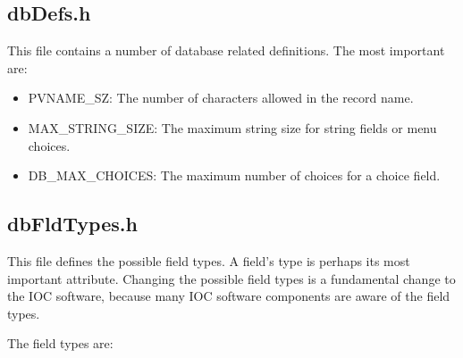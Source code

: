 \subsection{dbDefs.h}

This file contains a number of database related definitions. The most important are:

\begin{itemize}
\item {}PVNAME\_SZ:  The number of characters allowed in the record name.

\item {}MAX\_STRING\_SIZE:  The maximum string size for string fields or menu choices.

\item {}DB\_MAX\_CHOICES:  The maximum number of choices for a choice field.

\end{itemize}

\subsection{dbFldTypes.h}

This file defines the possible field types. A field's type is perhaps its most important attribute. Changing the possible field 
types is a fundamental change to the IOC software, because many IOC software components are aware of the field types.

The field types are:

